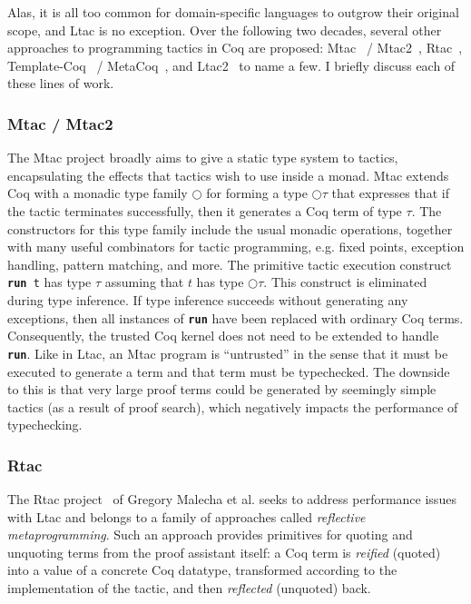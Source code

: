Alas, it is all too common for domain-specific languages to outgrow their
original scope, and Ltac is no exception.
Over the following two decades, several other approaches to programming
tactics in Coq are proposed:
Mtac~\cite{mtac-journal} / Mtac2~\cite{mtac2}, Rtac~\cite{rtac},
Template-Coq~\cite{template-coq} / MetaCoq~\cite{metacoq}, and
Ltac2~\cite{ltac2} to name a few.
I briefly discuss each of these lines of work.

\subsubsection{Mtac / Mtac2}

\newcommand{\trun}{{\bfseries run}}
\newcommand{\mtac}{\bigcirc}
The Mtac project broadly aims to give a static type system to tactics,
encapsulating the effects that tactics wish to use inside a monad.
Mtac extends Coq with a monadic type family $\mtac$ for forming a type $\mtac
\tau$ that expresses that if the tactic terminates successfully, then it generates
a Coq term of type $\tau$.
The constructors for this type family include the usual monadic operations,
together with many useful combinators for tactic programming, e.g. fixed points,
exception handling, pattern matching, and more.
The primitive tactic execution construct \texttt{\trun{} t} has type
$\tau$ assuming that $t$ has type $\mtac \tau$.
This construct is eliminated during type inference.
If type inference succeeds without generating any exceptions, then all instances
of \texttt{\trun} have been replaced with ordinary Coq terms.
Consequently, the trusted Coq kernel does not need to be extended to handle
\texttt{\trun}.
Like in Ltac, an Mtac program is ``untrusted'' in the sense that it must be
executed to generate a term and that term must be typechecked.
The downside to this is that very large proof terms could be generated by
seemingly simple tactics (as a result of proof search), which negatively impacts
the performance of typechecking.


\subsubsection{Rtac}

The Rtac project~\cite{rtac} of Gregory Malecha et al.
seeks to address performance issues with Ltac
and
belongs to a family of approaches called \emph{reflective metaprogramming}.
Such an approach provides primitives for quoting and unquoting terms from the
proof assistant itself: a Coq term is \emph{reified} (quoted) into a value of a
concrete Coq datatype, transformed according to the implementation of the
tactic, and then \emph{reflected} (unquoted) back.

